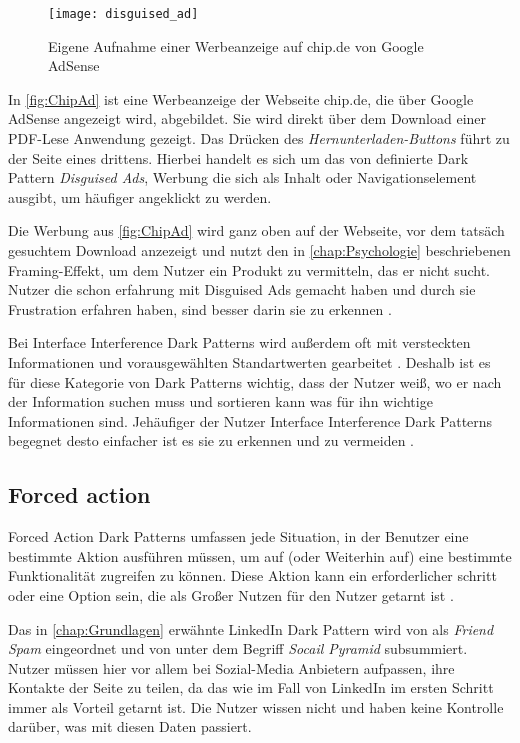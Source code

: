 \documentclass[conference,compsoc,final,a4paper]{IEEEtran}
\begin{document}
\begin{figure}[!ht]
  \centering
  \texttt{[image: disguised\_ad]}
  \caption{Eigene Aufnahme einer Werbeanzeige auf chip.de von Google AdSense~\autocite{ChipAd}}
  \label{fig:ChipAd}
\end{figure}

In \autoref{fig:ChipAd} ist eine Werbeanzeige der Webseite chip.de, die über Google AdSense angezeigt wird, abgebildet. Sie wird direkt über dem Download einer PDF-Lese Anwendung gezeigt. Das Drücken des \textit{Hernunterladen-Buttons} führt zu der Seite eines drittens. Hierbei handelt es sich um das von \citeauthor{Brignull} \autocite{Brignull} definierte Dark Pattern \textit{Disguised Ads}, Werbung die sich als Inhalt oder Navigationselement ausgibt, um häufiger angeklickt zu werden.

Die Werbung aus \autoref{fig:ChipAd} wird ganz oben auf der Webseite, vor dem tatsäch gesuchtem Download anzezeigt und nutzt den in \autoref{chap:Psychologie} beschriebenen Framing-Effekt, um dem Nutzer ein Produkt zu vermitteln, das er nicht sucht. Nutzer die schon erfahrung mit Disguised Ads gemacht haben und durch sie Frustration erfahren haben, sind besser darin sie zu erkennen \autocite{M.Bhoot2020}.

Bei Interface Interference Dark Patterns wird außerdem oft mit versteckten Informationen und vorausgewählten Standartwerten gearbeitet \autocite{Gray_2018}. Deshalb ist es für diese Kategorie von Dark Patterns wichtig, dass der Nutzer weiß, wo er nach der Information suchen muss und sortieren kann was für ihn wichtige Informationen sind. Jehäufiger der Nutzer Interface Interference Dark Patterns begegnet desto einfacher ist es sie zu erkennen und zu vermeiden \autocite{M.Bhoot2020}.

\subsection{Forced action}
Forced Action Dark Patterns umfassen jede Situation, in der Benutzer eine bestimmte Aktion ausführen müssen, um auf (oder Weiterhin auf) eine bestimmte Funktionalität zugreifen zu können. Diese Aktion kann ein erforderlicher schritt oder eine Option sein, die als Großer Nutzen für den Nutzer getarnt ist \autocite{Gray_2018}.

Das in \autoref{chap:Grundlagen} erwähnte LinkedIn Dark Pattern wird von \citeauthor{Brignull} \autocite{Brignull} als \textit{Friend Spam} eingeordnet und von \citeauthor*{Gray_2018} \autocite{Gray_2018} unter dem Begriff \textit{Socail Pyramid} subsummiert. Nutzer müssen hier vor allem bei Sozial-Media Anbietern aufpassen, ihre Kontakte der Seite zu teilen, da das wie im Fall von LinkedIn im ersten Schritt immer als Vorteil getarnt ist. Die Nutzer wissen nicht und haben keine Kontrolle darüber, was mit diesen Daten passiert.
\end{document}
